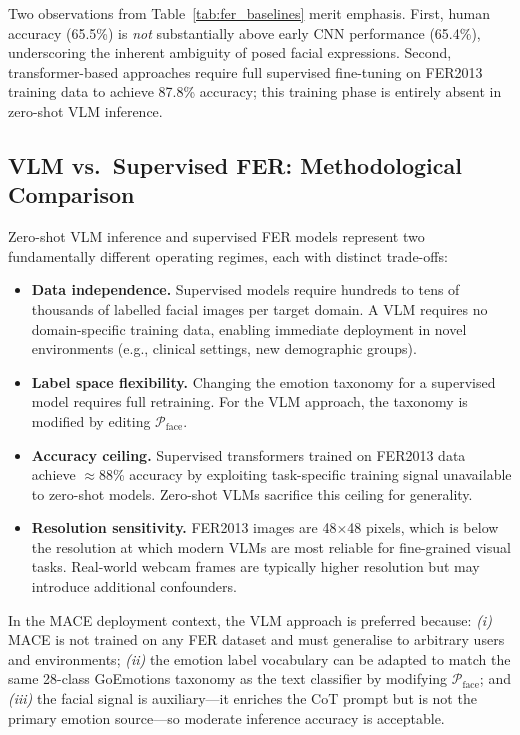 \documentclass[conference]{IEEEtran}
\begin{document}
Two observations from Table~\ref{tab:fer_baselines} merit
emphasis.
First, human accuracy (65.5\%) is \emph{not} substantially
above early CNN performance (65.4\%), underscoring the
inherent ambiguity of posed facial expressions.
Second, transformer-based approaches require full supervised
fine-tuning on FER2013 training data to achieve 87.8\%
accuracy; this training phase is entirely absent in
zero-shot VLM inference.

\subsection{VLM vs.\ Supervised FER: Methodological Comparison}

Zero-shot VLM inference and supervised FER models represent
two fundamentally different operating regimes, each with
distinct trade-offs:

\begin{itemize}
    \item \textbf{Data independence.}
          Supervised models require hundreds to tens of
          thousands of labelled facial images per target domain.
          A VLM requires no domain-specific training data,
          enabling immediate deployment in novel environments
          (e.g., clinical settings, new demographic groups).
    \item \textbf{Label space flexibility.}
          Changing the emotion taxonomy for a supervised model
          requires full retraining.
          For the VLM approach, the taxonomy is modified by
          editing $\mathcal{P}_{\text{face}}$.
    \item \textbf{Accuracy ceiling.}
          Supervised transformers trained on FER2013 data
          achieve $\approx$88\% accuracy by exploiting
          task-specific training signal unavailable to
          zero-shot models.
          Zero-shot VLMs sacrifice this ceiling for generality.
    \item \textbf{Resolution sensitivity.}
          FER2013 images are 48$\times$48 pixels, which is
          below the resolution at which modern VLMs are most
          reliable for fine-grained visual tasks.
          Real-world webcam frames are typically higher
          resolution but may introduce additional confounders.
\end{itemize}

In the MACE deployment context, the VLM approach is preferred
because:
\textit{(i)} MACE is not trained on any FER dataset and
must generalise to arbitrary users and environments;
\textit{(ii)} the emotion label vocabulary can be adapted
to match the same 28-class GoEmotions taxonomy as the text
classifier by modifying $\mathcal{P}_{\text{face}}$;
and \textit{(iii)} the facial signal is auxiliary---it
enriches the CoT prompt but is not the primary emotion
source---so moderate inference accuracy is acceptable.
\end{document}
